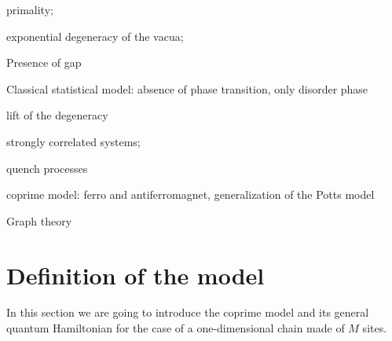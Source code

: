 \documentclass[aps,pra,superscriptaddress]{revtex4}
\renewcommand{\(}{\left(}
\renewcommand{\)}{\right)}
\renewcommand{\[}{\left[}
\renewcommand{\]}{\right]}
\begin{document}
primality; 

exponential degeneracy of the vacua; 

Presence of gap 

Classical statistical model: absence of phase transition, only disorder phase 

lift of the degeneracy 

strongly correlated systems; 

quench processes 

coprime model: ferro and antiferromagnet, generalization of the Potts model 

Graph theory 


\section{Definition of the model}
\label{sec:def}
\noindent
In this section we are going to introduce the coprime model and its general quantum Hamiltonian for the case of a one-dimensional chain made of 
$M$ sites. 
\end{document}
